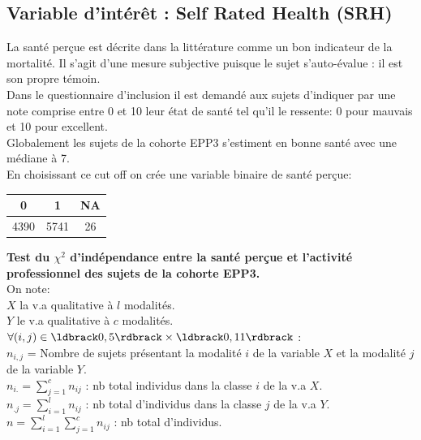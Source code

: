 \documentclass{book}
\begin{document}
\subsection{Variable d'intérêt : Self Rated Health (SRH)}
\noindent
La santé perçue est décrite dans la littérature comme un bon indicateur de la mortalité. Il s'agit d'une mesure subjective puisque le sujet s'auto-évalue : il est son propre témoin.\\
Dans le questionnaire d'inclusion il est demandé aux sujets d'indiquer par une note comprise entre 0 et 10 leur état de santé tel qu'il le ressente: 0 pour mauvais et 10 pour excellent.\\
\noindent
Globalement les sujets de la cohorte EPP3 s'estiment en bonne santé avec une médiane à 7.\\ En choisissant ce cut off on crée une variable binaire de santé perçue:

\begin{center}

\setlength\arrayrulewidth{.1pt}
\begin{tabular}{|c|c|c|}
\hline
  0  &  1& NA \\
  \hline
  \hline 
4390& 5741&   26\\
\hline 
\end{tabular}
\end{center}

\noindent
\textbf{Test du $\chi^2$ d'indépendance entre la santé perçue et l'activité professionnel des sujets de la cohorte EPP3.}\\

\noindent
On note:\\

\noindent
$X$ la v.a qualitative à $l$ modalités.\\
$Y$ le v.a qualitative à $c$ modalités.\\

\noindent
$\forall (i,j) \in \ldbrack 0,5 \rdbrack \times \ldbrack 0,11 \rdbrack$ :\\
$n_{i,j}$ = Nombre de sujets présentant la modalité $i$ de la variable $X$ et la modalité $j$ de la variable $Y$.\\
$n_{i.} = \sum_{j = 1} ^c n_{ij}$ : nb total individus dans la classe $i$ de la v.a $X$.\\
$n_{.j} = \sum_{i = 1} ^l n_{ij}$ : nb total d'individus dans la classe $j$ de la v.a $Y$.\\
\noindent
$n = \sum _{i = 1} ^ l \sum_{j = 1} ^c n_{ij}$ : nb total d'individus.\\
\end{document}
